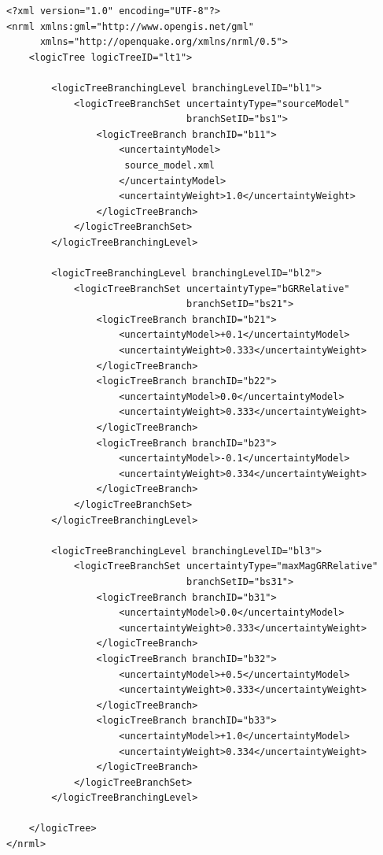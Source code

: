 \begin{Verbatim}[frame=single, commandchars=\\\{\}, fontsize=\normalsize]
<?xml version="1.0" encoding="UTF-8"?>
<nrml xmlns:gml="http://www.opengis.net/gml"
      xmlns="http://openquake.org/xmlns/nrml/0.5">
    <logicTree logicTreeID="lt1">

        <logicTreeBranchingLevel branchingLevelID="bl1">
            <logicTreeBranchSet uncertaintyType="sourceModel"
                                branchSetID="bs1">
                <logicTreeBranch branchID="b11">
                    <uncertaintyModel>
                     source_model.xml
                    </uncertaintyModel>
                    <uncertaintyWeight>1.0</uncertaintyWeight>
                </logicTreeBranch>
            </logicTreeBranchSet>
        </logicTreeBranchingLevel>

        <logicTreeBranchingLevel branchingLevelID="bl2">
            <logicTreeBranchSet uncertaintyType="bGRRelative"
                                branchSetID="bs21">
                <logicTreeBranch branchID="b21">
                    <uncertaintyModel>+0.1</uncertaintyModel>
                    <uncertaintyWeight>0.333</uncertaintyWeight>
                </logicTreeBranch>
                <logicTreeBranch branchID="b22">
                    <uncertaintyModel>0.0</uncertaintyModel>
                    <uncertaintyWeight>0.333</uncertaintyWeight>
                </logicTreeBranch>
                <logicTreeBranch branchID="b23">
                    <uncertaintyModel>-0.1</uncertaintyModel>
                    <uncertaintyWeight>0.334</uncertaintyWeight>
                </logicTreeBranch>
            </logicTreeBranchSet>
        </logicTreeBranchingLevel>

        <logicTreeBranchingLevel branchingLevelID="bl3">
            <logicTreeBranchSet uncertaintyType="maxMagGRRelative"
                                branchSetID="bs31">
                <logicTreeBranch branchID="b31">
                    <uncertaintyModel>0.0</uncertaintyModel>
                    <uncertaintyWeight>0.333</uncertaintyWeight>
                </logicTreeBranch>
                <logicTreeBranch branchID="b32">
                    <uncertaintyModel>+0.5</uncertaintyModel>
                    <uncertaintyWeight>0.333</uncertaintyWeight>
                </logicTreeBranch>
                <logicTreeBranch branchID="b33">
                    <uncertaintyModel>+1.0</uncertaintyModel>
                    <uncertaintyWeight>0.334</uncertaintyWeight>
                </logicTreeBranch>
            </logicTreeBranchSet>
        </logicTreeBranchingLevel>

    </logicTree>
</nrml>
\end{Verbatim}

